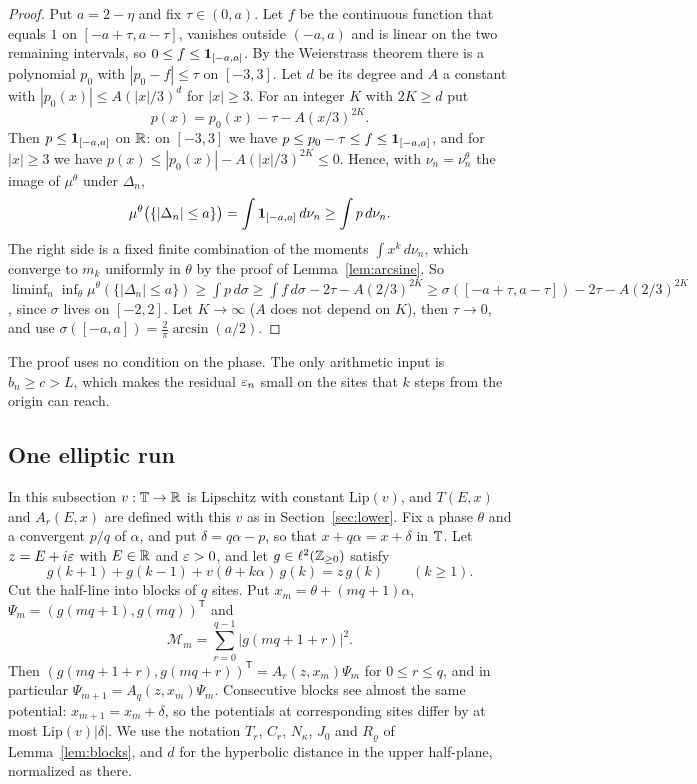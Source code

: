 \begin{proof}
Put $a=2-\eta$ and fix $\tau\in(0,a)$. Let $f$ be the continuous function that equals $1$ on $[-a+\tau,a-\tau]$, vanishes outside $(-a,a)$ and is linear on the two remaining intervals, so $0\le f\le\mathbf 1_{[-a,a]}$. By the Weierstrass theorem there is a polynomial $p_0$ with $|p_0-f|\le\tau$ on $[-3,3]$. Let $d$ be its degree and $A$ a constant with $|p_0(x)|\le A(|x|/3)^d$ for $|x|\ge3$. For an integer $K$ with $2K\ge d$ put
\[
p(x)=p_0(x)-\tau-A(x/3)^{2K}.
\]
Then $p\le\mathbf 1_{[-a,a]}$ on $\mathbb R$: on $[-3,3]$ we have $p\le p_0-\tau\le f\le\mathbf 1_{[-a,a]}$, and for $|x|\ge3$ we have $p(x)\le|p_0(x)|-A(|x|/3)^{2K}\le0$. Hence, with $\nu_n=\nu_n^\theta$ the image of $\mu^\theta$ under $\Delta_n$,
\[
\mu^\theta\bigl(\{|\Delta_n|\le a\}\bigr)=\int\mathbf 1_{[-a,a]}\,d\nu_n\ge\int p\,d\nu_n .
\]
The right side is a fixed finite combination of the moments $\int x^k\,d\nu_n$, which converge to $m_k$ uniformly in $\theta$ by the proof of Lemma~\ref{lem:arcsine}. So $\liminf_n\inf_\theta\mu^\theta(\{|\Delta_n|\le a\})\ge\int p\,d\sigma\ge\int f\,d\sigma-2\tau-A(2/3)^{2K}\ge\sigma([-a+\tau,a-\tau])-2\tau-A(2/3)^{2K}$, since $\sigma$ lives on $[-2,2]$. Let $K\to\infty$ ($A$ does not depend on $K$), then $\tau\to0$, and use $\sigma([-a,a])=\frac2\pi\arcsin(a/2)$.
\end{proof}


The proof uses no condition on the phase. The only arithmetic input is $b_n\ge c>L$, which makes the residual $\varepsilon_n$ small on the sites that $k$ steps from the origin can reach.

\subsection{One elliptic run}\label{sec:run}

In this subsection $v:\mathbb T\to\mathbb R$ is Lipschitz with constant $\mathrm{Lip}(v)$, and $T(E,x)$ and $A_r(E,x)$ are defined with this $v$ as in Section~\ref{sec:lower}. Fix a phase $\theta$ and a convergent $p/q$ of $\alpha$, and put $\delta=q\alpha-p$, so that $x+q\alpha=x+\delta$ in $\mathbb T$. Let $z=E+i\varepsilon$ with $E\in\mathbb R$ and $\varepsilon>0$, and let $g\in\ell^2(\mathbb Z_{\ge0})$ satisfy
\begin{equation}\label{eq:halfline}
g(k+1)+g(k-1)+v(\theta+k\alpha)\,g(k)=z\,g(k)\qquad(k\ge1).
\end{equation}
Cut the half-line into blocks of $q$ sites. Put $x_m=\theta+(mq+1)\alpha$, $\Psi_m=(g(mq+1),g(mq))^{\mathsf T}$ and
\[
\mathcal M_m=\sum_{r=0}^{q-1}|g(mq+1+r)|^2 .
\]
Then $(g(mq+1+r),g(mq+r))^{\mathsf T}=A_r(z,x_m)\Psi_m$ for $0\le r\le q$, and in particular $\Psi_{m+1}=A_q(z,x_m)\Psi_m$. Consecutive blocks see almost the same potential: $x_{m+1}=x_m+\delta$, so the potentials at corresponding sites differ by at most $\mathrm{Lip}(v)|\delta|$. We use the notation $T_r$, $C_r$, $N_\kappa$, $J_0$ and $R_\varrho$ of Lemma~\ref{lem:blocks}, and $d$ for the hyperbolic distance in the upper half-plane, normalized as there.

